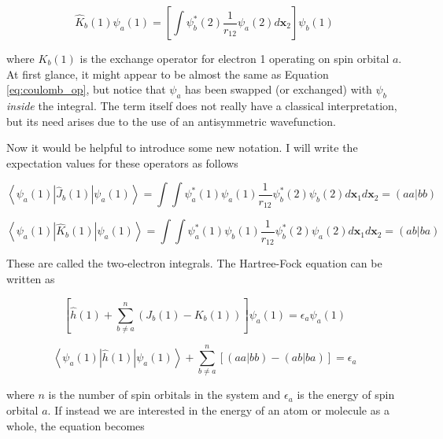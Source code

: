 \documentclass[12pt]{report}
\begin{document}
\begin{equation}
\label{eq:exchange_op}
\hat{K}_{b}(1)\psi_{a}(1)=\left[\int\psi^{*}_{b}(2)\frac{1}{r_{12}}\psi_{a}(2)d\textbf{x}_{2}\right]\psi_{b}(1)
\end{equation} 

where $K_{b}(1)$ is the exchange operator for electron 1 operating on spin orbital $a$. At first glance, it might appear to be almost the same as Equation \ref{eq:coulomb_op}, but notice that $\psi_{a}$ has been swapped (or exchanged) with $\psi_{b}$ \textit{inside} the integral. The term itself does not really have a classical interpretation, but its need arises due to the use of an antisymmetric wavefunction.

Now it would be helpful to introduce some new notation. I will write the expectation values for these operators as follows

\begin{equation}
\label{eq:coulomb_op_ex}
\left<\psi_{a}(1)|\hat{J}_{b}(1)|\psi_{a}(1)\right>=\int\int\psi^{*}_{a}(1)\psi_{a}(1)\frac{1}{r_{12}}\psi^{*}_{b}(2)\psi_{b}(2)d\textbf{x}_{1}d\textbf{x}_{2}
=\left(aa|bb\right)
\end{equation} 

\begin{equation}
\label{eq:exchange_op_ex}
\left<\psi_{a}(1)|\hat{K}_{b}(1)|\psi_{a}(1)\right>=\int\int\psi^{*}_{a}(1)\psi_{b}(1)\frac{1}{r_{12}}\psi^{*}_{b}(2)\psi_{a}(2)d\textbf{x}_{1}d\textbf{x}_{2}
=\left(ab|ba\right)
\end{equation}

These are called the two-electron integrals. The Hartree-Fock equation can be written as 

 \begin{equation}
\label{eq:hartree-fock_eq}
\left[\hat{h}(1) + \sum^{n}_{b\neq a}\left(J_{b}(1)- K_{b}(1)\right)\right]\psi_{a}(1) = \epsilon_{a}\psi_{a}(1)
\end{equation}

 \begin{equation}
\label{eq:hartree-fock_eq}
\left<\psi_{a}(1)|\hat{h}(1)|\psi_{a}(1)\right> + \sum^{n}_{b\neq a}\left[\left(aa|bb\right) - \left(ab|ba\right)\right] = \epsilon_{a}
\end{equation}

where $n$ is the number of spin orbitals in the system and $\epsilon_{a}$ is the energy of spin orbital $a$. If instead we are interested in the energy of an atom or molecule as a whole, the equation becomes
\end{document}
